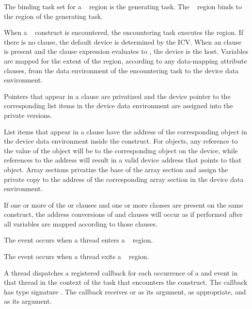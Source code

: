 \binding
The binding task set for a ~ region is the generating task. 
The ~ region binds to the region of the generating task.

\descr
When a ~ construct is encountered, the encountering task
executes the region. If there is no  clause, the default device is
determined by the  ICV. When an  clause is present 
and the  clause expression evaluates to , the device is the host.
Variables are mapped for the extent of the region, according to any data-mapping 
attribute clauses, from the data environment of the encountering task to the 
device data environment.

Pointers that appear in a  clause are privatized and the
device pointer to the corresponding list items in the device data environment
are assigned into the private versions.  

List items that appear in a  clause have the address of
the corresponding object in the device data environment inside the construct.
For objects, any reference to the value of the object will be to the
corresponding object on the device, while references to the address will result
in a valid device address that points to that object.  Array sections privatize the
base of the array section and assign the private copy to the address of the
corresponding array section in the device data environment.  

If one or more of the  or
 clauses and one or more  clauses are present on the
same construct, the address conversions of  and
 clauses will occur as if performed after all variables
are mapped according to those  clauses.

\events

The  event occurs when a thread enters 
a ~ region.

The  event occurs when a thread exits a
~ region.

\tools

A thread dispatches a registered  callback for each 
occurrence of a  and  event in that 
thread in the context of the task that encounters the construct. The callback has 
type signature . The callback receives 
 or 
as its  argument, as appropriate, and
 as its  argument.

